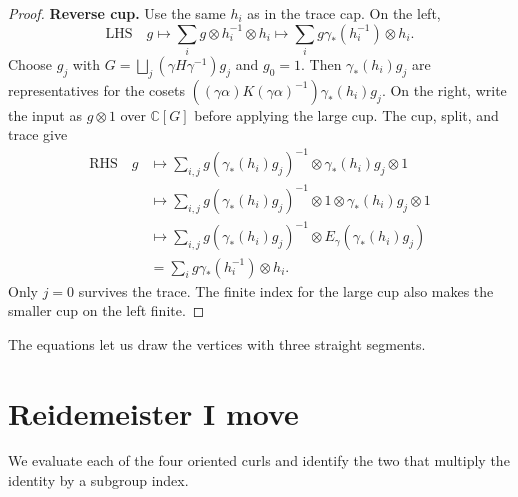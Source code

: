 \documentclass[11pt,a4paper]{article}
\numberwithin{equation}{section}
\theoremstyle{definition}
\newcommand{\C}{\mathbb C}
\begin{document}
\begin{proof}
\textbf{Reverse cup.}
Use the same \(h_i\) as in the trace cap. On the left,
\[
\text{LHS}\quad g
 \longmapsto \sum_i g\otimes h_i^{-1}\otimes h_i
 \longmapsto \sum_i g\gamma_*(h_i^{-1})\otimes h_i.
\]
Choose \(g_j\) with \(G=\bigsqcup_j(\gamma H\gamma^{-1})g_j\) and
\(g_0=1\). Then \(\gamma_*(h_i)g_j\) are representatives for
the cosets \(((\gamma\alpha)K(\gamma\alpha)^{-1})\gamma_*(h_i)g_j\).
On the right, write the input as \(g\otimes1\) over \(\C[G]\)
before applying the large cup. The cup, split, and trace give
\[
\begin{aligned}
\text{RHS}\quad g
 &\longmapsto \sum_{i,j}
     g(\gamma_*(h_i)g_j)^{-1}\otimes\gamma_*(h_i)g_j\otimes1\\
 &\longmapsto \sum_{i,j}
     g(\gamma_*(h_i)g_j)^{-1}\otimes1\otimes\gamma_*(h_i)g_j\otimes1\\
 &\longmapsto \sum_{i,j}
     g(\gamma_*(h_i)g_j)^{-1}\otimes E_\gamma(\gamma_*(h_i)g_j)\\
 &=\sum_i g\gamma_*(h_i^{-1})\otimes h_i.
\end{aligned}
\]
Only \(j=0\) survives the trace. The finite index for the large cup
also makes the smaller cup on the left finite.
\end{proof}

The equations let us draw the vertices with three straight segments.

\begin{center}
\end{center}

\section{Reidemeister I move}\label{sec:reidemeister-one}

We evaluate each of the four oriented curls and identify the two
that multiply the identity by a subgroup index.
\end{document}
